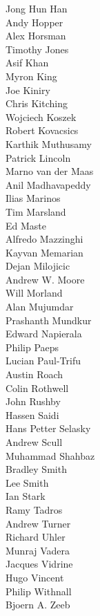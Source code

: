 \begin{small}
\begin{autogrid}{4}
Jong Hun Han \\
Andy Hopper \\
Alex Horsman \\
Timothy Jones \\
Asif Khan \\
Myron King \\
Joe Kiniry \\
Chris Kitching \\
Wojciech Koszek \\
Robert Kovacsics \\
Karthik Muthusamy \\
Patrick Lincoln \\
Marno van der Maas \\
Anil Madhavapeddy \\
Ilias Marinos \\
Tim Marsland \\
Ed Maste \\
Alfredo Mazzinghi \\
Kayvan Memarian \\
Dejan Milojicic \\
Andrew W. Moore \\
Will Morland \\
Alan Mujumdar \\
Prashanth Mundkur \\
Edward Napierala \\
Philip Paeps \\
Lucian Paul-Trifu \\
Austin Roach \\
Colin Rothwell \\
John Rushby \\
Hassen Saidi \\
Hans Petter Selasky \\
Andrew Scull \\
Muhammad Shahbaz \\
Bradley Smith \\
Lee Smith \\
Ian Stark \\
Ramy Tadros \\
Andrew Turner \\
Richard Uhler \\
Munraj Vadera \\
Jacques Vidrine \\
Hugo Vincent \\
Philip Withnall \\
Bjoern A. Zeeb \\
\end{autogrid}
\end{small}

